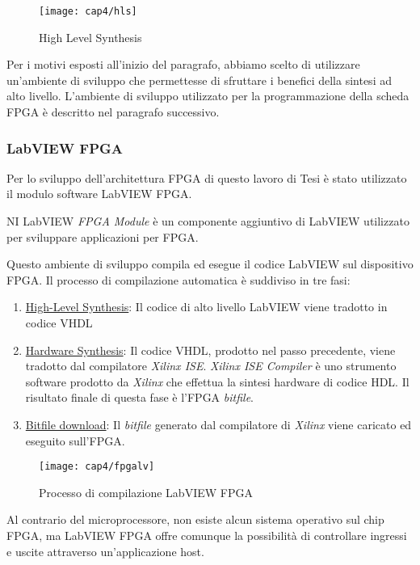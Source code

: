 \begin{figure}[H]  
	\begin{center}
		\texttt{[image: cap4/hls]}
		\caption{High Level Synthesis}
	\end{center}
\end{figure}

Per i motivi esposti all'inizio del paragrafo, abbiamo scelto di utilizzare un'ambiente di sviluppo che permettesse di sfruttare i benefici della sintesi ad alto livello. L'ambiente di sviluppo utilizzato per la programmazione della scheda FPGA è descritto nel paragrafo successivo.
		
\subsubsection{LabVIEW FPGA}
Per lo sviluppo dell'architettura FPGA di questo lavoro di Tesi è stato utilizzato il modulo software LabVIEW FPGA. 

NI LabVIEW \textit{FPGA Module} è un componente aggiuntivo di LabVIEW utilizzato per sviluppare applicazioni per FPGA.

Questo ambiente di sviluppo compila ed esegue il codice LabVIEW sul dispositivo FPGA. Il processo di compilazione automatica è suddiviso in tre fasi:
\begin{enumerate}
	\item \underline{High-Level Synthesis}: Il codice di alto livello LabVIEW viene tradotto in codice VHDL
	\item \underline{Hardware Synthesis}: Il codice VHDL, prodotto nel passo precedente, viene tradotto dal compilatore \textit{Xilinx ISE}. \textit{Xilinx ISE Compiler} è uno strumento software prodotto da \textit{Xilinx} che effettua la sintesi hardware di codice HDL. Il risultato finale di questa fase è l'FPGA \textit{bitfile}.
	\item \underline{Bitfile download}: Il \textit{bitfile} generato dal compilatore di \textit{Xilinx} viene caricato ed eseguito sull'FPGA.
\end{enumerate}

\begin{figure}[H] 
  \begin{center}
    \texttt{[image: cap4/fpgalv]}
    \caption{Processo di compilazione LabVIEW FPGA}
  \end{center}
\end{figure}

Al contrario del microprocessore, non esiste alcun sistema operativo sul chip FPGA, ma LabVIEW FPGA offre comunque la possibilità di controllare ingressi e uscite attraverso un'applicazione host.

